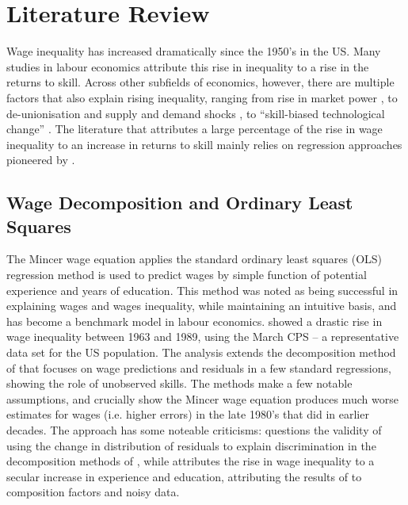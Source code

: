 \documentclass[notitlepage,12pt]{article}
\begin{document}
\section{Literature Review}
Wage inequality has increased dramatically since the 1950's in the US.  Many studies in labour economics attribute this rise in inequality to a rise in the returns to skill.  Across other subfields of economics, however, there are multiple factors that also explain rising inequality, ranging from rise in market power \citep{furman2015firm}, to de-unionisation and supply and demand shocks \citep{DML95}, to ``skill-biased technological change'' \citep{acemoglu1998new,acemoglu2002technical}.  The literature that attributes a large percentage of the rise in wage inequality to an increase in returns to skill mainly relies on regression approaches pioneered by \cite{mincer1958investment,mincer1974schooling}.  

\subsection{Wage Decomposition and Ordinary Least Squares}

The Mincer wage equation applies the standard ordinary least squares (OLS) regression method is used to predict wages by simple function of potential experience and years of education.  This method was noted as being successful in explaining wages and wages inequality, while maintaining an intuitive basis, and has become a benchmark model in labour economics.  \cite{juhn1993wage} showed a drastic rise in wage inequality between 1963 and 1989, using the March CPS -- a representative data set for the US population.  The analysis extends the decomposition method of \cite{jmp2011} that focuses on wage predictions and residuals in a few standard regressions, showing the role of unobserved skills.  The methods make a few notable assumptions, and crucially show the Mincer wage equation produces much worse estimates for wages (i.e. higher errors) in the late 1980's that did in earlier decades.  The approach has some noteable criticisms: \cite{yun2009wage} questions the validity of using the change in distribution of residuals to explain discrimination in the decomposition methods of \cite{jmp2011,juhn1993wage}, while \cite{lemieux2006increasing} attributes the rise in wage inequality to a secular increase in experience and education, attributing the results of \cite{juhn1993wage} to composition factors and noisy data.
\end{document}
